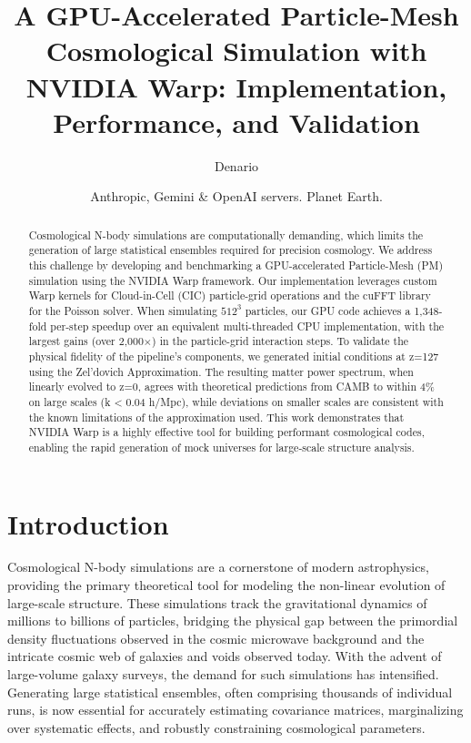 \documentclass[]{article}
\begin{document}
\title{A GPU-Accelerated Particle-Mesh Cosmological Simulation with NVIDIA Warp: Implementation, Performance, and Validation}

\author{Denario}
\date{Anthropic, Gemini \& OpenAI servers. Planet Earth.}

\maketitle
\begin{abstract}
Cosmological N-body simulations are computationally demanding, which limits the generation of large statistical ensembles required for precision cosmology. We address this challenge by developing and benchmarking a GPU-accelerated Particle-Mesh (PM) simulation using the NVIDIA Warp framework. Our implementation leverages custom Warp kernels for Cloud-in-Cell (CIC) particle-grid operations and the cuFFT library for the Poisson solver. When simulating $512^3$ particles, our GPU code achieves a 1,348-fold per-step speedup over an equivalent multi-threaded CPU implementation, with the largest gains (over 2,000$\times$) in the particle-grid interaction steps. To validate the physical fidelity of the pipeline's components, we generated initial conditions at z=127 using the Zel'dovich Approximation. The resulting matter power spectrum, when linearly evolved to z=0, agrees with theoretical predictions from CAMB to within 4\% on large scales (k < 0.04 h/Mpc), while deviations on smaller scales are consistent with the known limitations of the approximation used. This work demonstrates that NVIDIA Warp is a highly effective tool for building performant cosmological codes, enabling the rapid generation of mock universes for large-scale structure analysis.
\end{abstract}








\section{Introduction}
\label{sec:intro}
Cosmological N-body simulations are a cornerstone of modern astrophysics, providing the primary theoretical tool for modeling the non-linear evolution of large-scale structure. These simulations track the gravitational dynamics of millions to billions of particles, bridging the physical gap between the primordial density fluctuations observed in the cosmic microwave background and the intricate cosmic web of galaxies and voids observed today. With the advent of large-volume galaxy surveys, the demand for such simulations has intensified. Generating large statistical ensembles, often comprising thousands of individual runs, is now essential for accurately estimating covariance matrices, marginalizing over systematic effects, and robustly constraining cosmological parameters.
\end{document}
